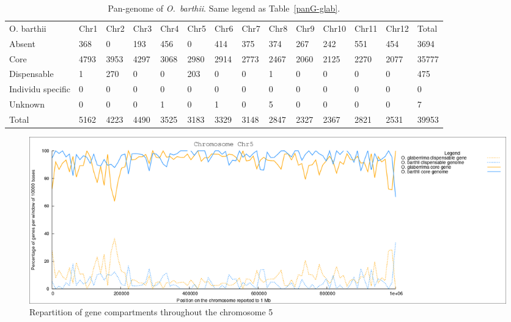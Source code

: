 \documentclass[10pt,letterpaper]{article}
\begin{document}
\begin{table}[]
\centering
\footnotesize
\begin{tabular}{llllllllllllll}
O. barthii                    & Chr1 & Chr2 & Chr3 & Chr4 & Chr5 & Chr6 & Chr7 & Chr8 & Chr9 & Chr10 & Chr11 & Chr12 & Total \\
Absent                        & 368  & 0    & 193  & 456  & 0    & 414  & 375  & 374  & 267  & 242   & 551   & 454   & 3694  \\
Core                          & 4793 & 3953 & 4297 & 3068 & 2980 & 2914 & 2773 & 2467 & 2060 & 2125  & 2270  & 2077  & 35777 \\
Dispensable                   & 1    & 270  & 0    & 0    & 203  & 0    & 0    & 1    & 0    & 0     & 0     & 0     & 475   \\
Individu specific             & 0    & 0    & 0    & 0    & 0    & 0    & 0    & 0    & 0    & 0     & 0     & 0     & 0     \\
Unknown                       & 0    & 0    & 0    & 1    & 0    & 1    & 0    & 5    & 0    & 0     & 0     & 0     & 7     \\
Total                         & 5162 & 4223 & 4490 & 3525 & 3183 & 3329 & 3148 & 2847 & 2327 & 2367  & 2821  & 2531  & 39953
\end{tabular}
\caption{Pan-genome of \emph{O.~barthii}. Same legend as Table~\ref{panG-glab}.}
\label{panG-bar}
\end{table}

\begin{figure}
\centering
\includegraphics[scale=0.35]{Chr5.png}
\caption{Repartition of gene compartments throughout the chromosome 5}
\label{repartition}
\end{figure}
\end{document}
